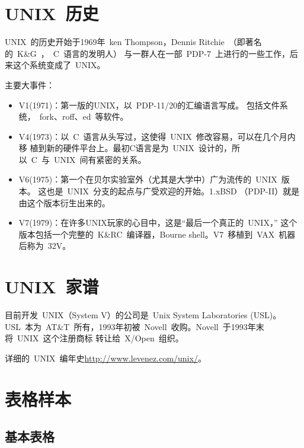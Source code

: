 \section{UNIX~历史}
\label{sec:history}
UNIX~的历史开始于1969年~ken Thompson，Dennis Ritchie~（即著名的~K\&G~，~C~语言的发明人）
与一群人在一部~PDP-7~上进行的一些工作，后来这个系统变成了~UNIX。\par
主要大事件：
\begin{itemize}
    \item V1(1971)：第一版的UNIX，以~PDP-11/20的汇编语言写成。
        包括文件系统，~fork、roff、ed~等软件。
    \item V4(1973)：以~C~语言从头写过，这使得~UNIX~修改容易，可以在几个月内移
        植到新的硬件平台上。最初C语言是为~UNIX~设计的，所以~C~与~UNIX~间有紧密的关系。
    \item V6(1975)：第一个在贝尔实验室外（尤其是大学中）广为流传的~UNIX~版本。
        这也是~UNIX~分支的起点与广受欢迎的开始。1.xBSD （PDP-II）就是由这个版本衍生出来的。
    \item V7(1979)：在许多UNIX玩家的心目中，这是“最后一个真正的~UNIX，”
        这个版本包括一个完整的~K\&RC~编译器，Bourne
        shell。V7~移植到~VAX~机器后称为~32V。
\end{itemize}
\section{UNIX~家谱}
目前开发~UNIX（System V）的公司是~Unix System Laboratories
(USL)。USL~本为~AT\&T~所有，1993年初被~Novell~收购。Novell~于1993年末将~UNIX~这个注册商标
转让给~X/Open~组织。

\label{sec:family}

详细的~UNIX~编年史\url{http://www.levenez.com/unix/}。

\section{表格样本}
\label{chap1:sample:table}

\subsection{基本表格}
\label{sec:basictable}

